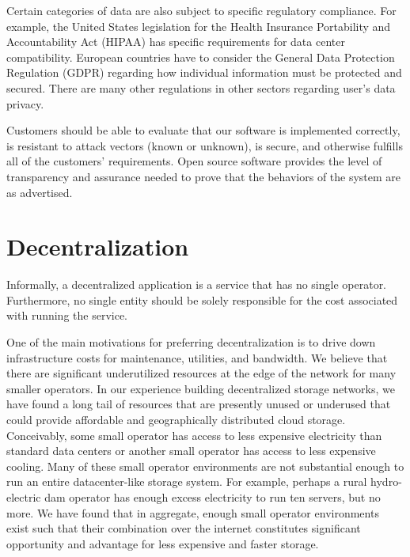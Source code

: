 \documentclass[8pt,fleqn,openany]{book}
\begin{document}
Certain categories of data are also subject to specific regulatory compliance.
For example, the United States legislation for
the Health Insurance Portability and
Accountability Act (HIPAA) has specific requirements for data center
compatibility. European countries have to consider the General Data Protection
Regulation (GDPR) regarding
how individual information must be protected and secured. There
are many other regulations in other sectors regarding user's data privacy. 

Customers should be able to
evaluate that our software is implemented correctly, is resistant to
attack vectors (known or unknown), is secure, and otherwise fulfills all
of the customers' requirements.
Open source software
provides the level of transparency and assurance needed to prove that the
behaviors of the system are as advertised.

\section{Decentralization}

Informally, a decentralized application is a service that has no single
operator. Furthermore, no single entity should be solely responsible for the
cost associated with running the service.

One of the main motivations for preferring decentralization is to drive
down infrastructure costs for maintenance, utilities, and bandwidth.
We believe that there
are significant underutilized resources at the edge of the network
for many smaller operators. In our experience building decentralized
storage networks, we have found a long tail of resources that are presently
unused or underused that could provide affordable and
geographically distributed cloud storage. Conceivably, some small operator
has access to less expensive electricity than standard data centers or another small
operator has access to less expensive cooling. Many of these small operator
environments are not substantial enough to run an entire datacenter-like
storage system. For example, perhaps a rural hydro-electric dam operator has
enough excess electricity to run ten servers, but no more. We have found that
in aggregate, enough small operator environments exist such that their
combination over the internet constitutes
significant opportunity and advantage for less expensive and faster storage.
\end{document}
